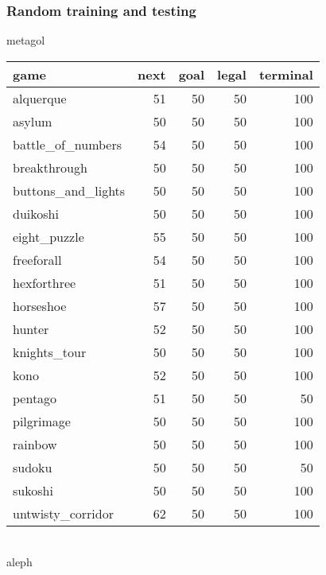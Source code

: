 \documentclass[a4paper,12pt]{report}
\begin{document}
\subsubsection{Random training and testing}
metagol
\\
\begin{tabular}{lrrrr}
\hline
 game               &   next &   goal &   legal &   terminal \\
\hline
 alquerque          &     51 &     50 &      50 &        100 \\
 asylum             &     50 &     50 &      50 &        100 \\
 battle\_of\_numbers  &     54 &     50 &      50 &        100 \\
 breakthrough       &     50 &     50 &      50 &        100 \\
 buttons\_and\_lights &     50 &     50 &      50 &        100 \\
 duikoshi           &     50 &     50 &      50 &        100 \\
 eight\_puzzle       &     55 &     50 &      50 &        100 \\
 freeforall         &     54 &     50 &      50 &        100 \\
 hexforthree        &     51 &     50 &      50 &        100 \\
 horseshoe          &     57 &     50 &      50 &        100 \\
 hunter             &     52 &     50 &      50 &        100 \\
 knights\_tour       &     50 &     50 &      50 &        100 \\
 kono               &     52 &     50 &      50 &        100 \\
 pentago            &     51 &     50 &      50 &         50 \\
 pilgrimage         &     50 &     50 &      50 &        100 \\
 rainbow            &     50 &     50 &      50 &        100 \\
 sudoku             &     50 &     50 &      50 &         50 \\
 sukoshi            &     50 &     50 &      50 &        100 \\
 untwisty\_corridor  &     62 &     50 &      50 &        100 \\
\hline
\end{tabular}
\\
aleph
\\
\end{document}
